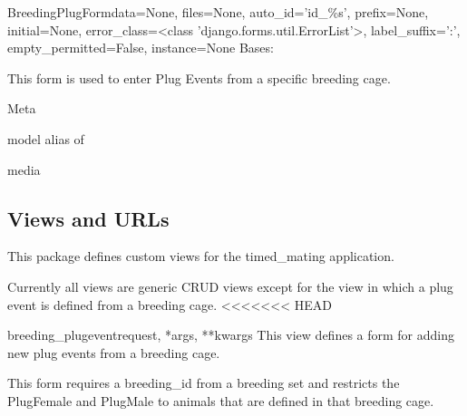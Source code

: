 \documentclass[letterpaper,10pt,english]{sphinxmanual}
\begin{document}
\hypertarget{timed\_mating.forms.BreedingPlugForm}{}\begin{classdesc}{BreedingPlugForm}{data=None, files=None, auto\_id='id\_\%s', prefix=None, initial=None, error\_class=\textless{}class 'django.forms.util.ErrorList'\textgreater{}, label\_suffix=':', empty\_permitted=False, instance=None}
Bases: 

This form is used to enter Plug Events from a specific breeding cage.

\hypertarget{timed\_mating.forms.BreedingPlugForm.Meta}{}\begin{classdesc}{Meta}{}~

\hypertarget{timed\_mating.forms.BreedingPlugForm.Meta.model}{}\begin{memberdesc}{model}
alias of 
\end{memberdesc}
\end{classdesc}

\hypertarget{timed\_mating.forms.BreedingPlugForm.media}{}\begin{memberdesc}[BreedingPlugForm]{media}\end{memberdesc}
\end{classdesc}


\subsection{Views and URLs}
\hypertarget{module-timed\_mating.views}{}
\modulesynopsis{}
This package defines custom views for the timed\_mating application.

Currently all views are generic CRUD views except for the view in which a plug event is defined from a breeding cage.
<<<<<<< HEAD

\hypertarget{timed\_mating.views.breeding\_plugevent}{}\begin{funcdesc}{breeding\_plugevent}{request, *args, **kwargs}
This view defines a form for adding new plug events from a breeding cage.

This form requires a breeding\_id from a breeding set and restricts the PlugFemale and PlugMale to animals that are defined in that breeding cage.
\end{funcdesc}
\hypertarget{module-timed\_mating.urls}{}
\modulesynopsis{}
\end{document}
